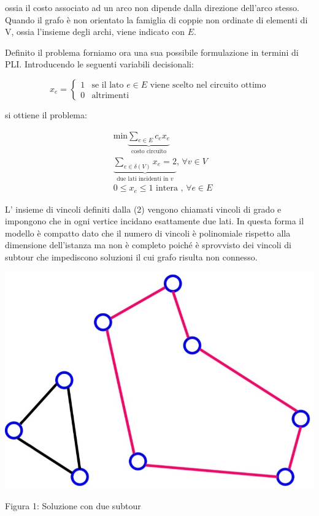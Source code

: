 \documentclass[11pt]{article}
\begin{document}
ossia il costo associato ad un arco non dipende dalla direzione dell'arco stesso. Quando il grafo \`e non orientato la famiglia di coppie non ordinate di elementi di V, ossia l'insieme degli archi, viene indicato con $E$.


Definito il problema forniamo ora una sua possibile formulazione in termini di PLI. Introducendo le seguenti variabili decisionali:

\[
x_{e}=
\begin{cases}
1 & \text{se il lato $e \in E$ viene scelto nel circuito ottimo} \\
0 & \text{altrimenti}
\end{cases}
\]

si ottiene il problema:

\begin{eqnarray}
& \text{min}\displaystyle\underbrace{\sum_{e \in E} c_e x_e}_{\text{costo circuito}} \\[1.5ex]
&\displaystyle\underbrace{\sum_{e \in \delta(V)} x_e = 2}_{\text{due lati incidenti in }v}\text{,  }\forall v \in V \\[1.5ex]
&0\leq x_e \leq 1 \text{ intera , }\forall e \in E
\end{eqnarray}

L' insieme di vincoli definiti dalla (2) vengono chiamati vincoli di grado e impongono che in ogni vertice incidano esattamente due lati. In questa forma il modello \`e  compatto dato che il numero di vincoli \`e polinomiale rispetto alla dimensione dell'istanza ma non \`e completo poich\'e \`e sprovvisto dei vincoli di subtour che impediscono soluzioni il cui grafo risulta non connesso.

\begin{center}
\includegraphics[scale=0.5]{subtour}  

Figura 1: Soluzione con due subtour
\end{center}
\end{document}
